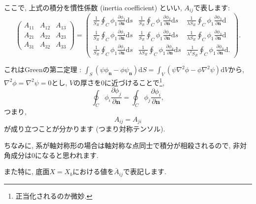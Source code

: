 \documentclass[uplatex,dvipdfmx,a4j,11  pt]{jsarticle}
\newcommand{\diff}{\mathrm{d}} %
\begin{document}
ここで, 上式の積分を慣性係数 (inertia coefficient) といい, $A_{ij}$で表します:
\begin{equation}
  \begin{pmatrix}
    A_{11} & A_{12} & A_{13}\\
    A_{21} & A_{22} & A_{23}\\
    A_{31} & A_{32} & A_{33}
  \end{pmatrix}
  = 
  \begin{pmatrix}
    \frac{1}{S_R}\oint_C\phi_1\frac{\partial \phi_1}{\partial\mathbf{n}}\diff s &
    \frac{1}{S_R}\oint_C\phi_1\frac{\partial \phi_2}{\partial\mathbf{n}}\diff s &
    \frac{1}{\lambda S_R}\oint_C\phi_1\frac{\partial \phi_3}{\partial\mathbf{n}}\diff \\
    \frac{1}{S_R}\oint_C\phi_1\frac{\partial \phi_1}{\partial\mathbf{n}}\diff s &
    \frac{1}{S_R}\oint_C\phi_1\frac{\partial \phi_2}{\partial\mathbf{n}}\diff s &
    \frac{1}{\lambda S_R}\oint_C\phi_1\frac{\partial \phi_3}{\partial\mathbf{n}}\diff \\
    \frac{1}{S_R}\oint_C\phi_1\frac{\partial \phi_1}{\partial\mathbf{n}}\diff s &
    \frac{1}{\lambda S_R}\oint_C\phi_1\frac{\partial \phi_2}{\partial\mathbf{n}}\diff s &
    \frac{1}{\lambda^2 S_R}\oint_C\phi_1\frac{\partial \phi_3}{\partial\mathbf{n}}\diff .
  \end{pmatrix}.
\end{equation}

これはGreenの第二定理 : $\displaystyle \int_S (\psi \phi_\mathbf{n} - \phi \psi_\mathbf{n})\diff S = \int_V (\psi\nabla^2\phi - \phi\nabla^2\psi)\diff V$から, $\nabla^2\phi = \nabla^2\psi=0$とし, $V$の厚さを$0$に近づけることで\footnote{正当化されるのか微妙.},
\begin{equation}
  \oint_C \phi_i \frac{\partial\phi_j}{\partial \mathbf{n}} =
  \oint_C \phi_j \frac{\partial\phi_i}{\partial \mathbf{n}},
\end{equation}
つまり, 
\begin{equation}
  A_{ij} = A_{ji}
\end{equation}
が成り立つことが分かります (つまり対称テンソル).

ちなみに, 系が軸対称形の場合は軸対称な点同士で積分が相殺されるので, 非対角成分は$0$になると思われます.

また特に, 底面$X = X_b$における値を$\bar{A}_{ij}$で表記します.

\enskip
\end{document}
